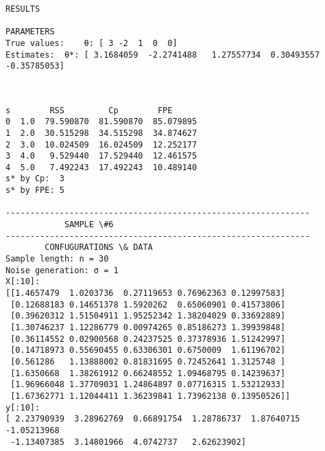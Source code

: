 \documentclass[11pt]{article}
\begin{document}
\begin{Verbatim}[commandchars=\\\{\}]
			RESULTS

PARAMETERS
True values:	θ: [ 3 -2  1  0  0]
Estimates:	θ*: [ 3.1684059  -2.2741488   1.27557734  0.30493557 -0.35785053]

    \end{Verbatim}

    \begin{center}
    \end{center}
    { \hspace*{\fill} \\}
    
    \begin{Verbatim}[commandchars=\\\{\}]
     s        RSS         Cp        FPE
0  1.0  79.590870  81.590870  85.079895
1  2.0  30.515298  34.515298  34.874627
2  3.0  10.024509  16.024509  12.252177
3  4.0   9.529440  17.529440  12.461575
4  5.0   7.492243  17.492243  10.489140
s* by Cp:  3
s* by FPE: 5

--------------------------------------------------------------
			SAMPLE \#6
--------------------------------------------------------------
		CONFUGURATIONS \& DATA
Sample length: n = 30
Noise generation: σ = 1
X[:10]:
[[1.4657479  1.0203736  0.27119653 0.76962363 0.12997583]
 [0.12688183 0.14651378 1.5920262  0.65060901 0.41573806]
 [0.39620312 1.51504911 1.95252342 1.38204029 0.33692889]
 [1.30746237 1.12286779 0.00974265 0.85186273 1.39939848]
 [0.36114552 0.02900568 0.24237525 0.37378936 1.51242997]
 [0.14718973 0.55690455 0.63306301 0.6750009  1.61196702]
 [0.561286   1.13888002 0.81831695 0.72452641 1.3125748 ]
 [1.6350668  1.38261912 0.66248552 1.09468795 0.14239637]
 [1.96966048 1.37709031 1.24864897 0.07716315 1.53212933]
 [1.67362771 1.12044411 1.36239841 1.73962138 0.13950526]]
y[:10]:
[ 2.23790939  3.28962769  0.66891754  1.28786737  1.87640715 -1.05213968
 -1.13407385  3.14801966  4.0742737   2.62623902]


\end{Verbatim}
\end{document}
